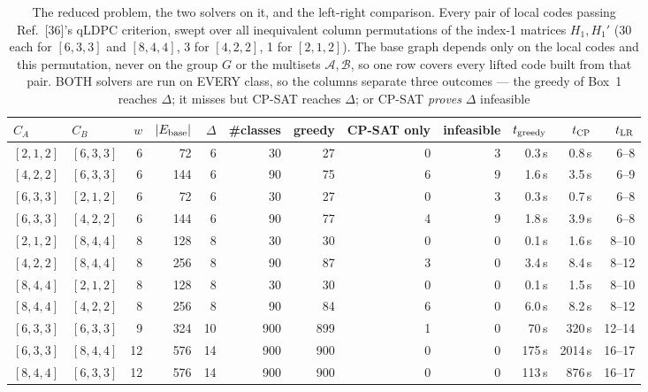 \begin{table}
\centering
\begin{tabular}{@{}llrrrrrrrrrr@{}}
\toprule
$C_A$ & $C_B$ & $w$ & $|E_{\rm base}|$ & $\Delta$ & \#classes & greedy & CP-SAT only & infeasible & $t_{\rm greedy}$ & $t_{\rm CP}$ & $t_{\rm LR}$ \\
\midrule
$[2,1,2]$ & $[6,3,3]$ & 6 & 72 & 6 & 30 & 27 & 0 & 3 & 0.3\,s & 0.8\,s & 6--8 \\
$[4,2,2]$ & $[6,3,3]$ & 6 & 144 & 6 & 90 & 75 & 6 & 9 & 1.6\,s & 3.5\,s & 6--9 \\
$[6,3,3]$ & $[2,1,2]$ & 6 & 72 & 6 & 30 & 27 & 0 & 3 & 0.3\,s & 0.7\,s & 6--8 \\
$[6,3,3]$ & $[4,2,2]$ & 6 & 144 & 6 & 90 & 77 & 4 & 9 & 1.8\,s & 3.9\,s & 6--8 \\
$[2,1,2]$ & $[8,4,4]$ & 8 & 128 & 8 & 30 & 30 & 0 & 0 & 0.1\,s & 1.6\,s & 8--10 \\
$[4,2,2]$ & $[8,4,4]$ & 8 & 256 & 8 & 90 & 87 & 3 & 0 & 3.4\,s & 8.4\,s & 8--12 \\
$[8,4,4]$ & $[2,1,2]$ & 8 & 128 & 8 & 30 & 30 & 0 & 0 & 0.1\,s & 1.5\,s & 8--10 \\
$[8,4,4]$ & $[4,2,2]$ & 8 & 256 & 8 & 90 & 84 & 6 & 0 & 6.0\,s & 8.2\,s & 8--12 \\
$[6,3,3]$ & $[6,3,3]$ & 9 & 324 & 10 & 900 & 899 & 1 & 0 & 70\,s & 320\,s & 12--14 \\
$[6,3,3]$ & $[8,4,4]$ & 12 & 576 & 14 & 900 & 900 & 0 & 0 & 175\,s & 2014\,s & 16--17 \\
$[8,4,4]$ & $[6,3,3]$ & 12 & 576 & 14 & 900 & 900 & 0 & 0 & 113\,s & 876\,s & 16--17 \\
\bottomrule
\end{tabular}
\caption{The reduced problem, the two solvers on it, and the left-right
comparison. Every pair of local codes passing Ref.~[36]'s qLDPC criterion, swept
over all inequivalent column permutations of the index-1 matrices $H_1, H_1'$
(30 each for $[6,3,3]$ and $[8,4,4]$, 3 for $[4,2,2]$, 1 for $[2,1,2]$). The
base graph depends only on the local codes and this permutation, never on the
group $G$ or the multisets $\mathcal{A},\mathcal{B}$, so one row covers every
lifted code built from that pair. BOTH solvers are run on EVERY class, so the
columns separate three outcomes --- the greedy of Box~1 reaches $\Delta$; it
misses but CP-SAT reaches $\Delta$; or CP-SAT \emph{proves} $\Delta$ infeasible
}
\end{table}
